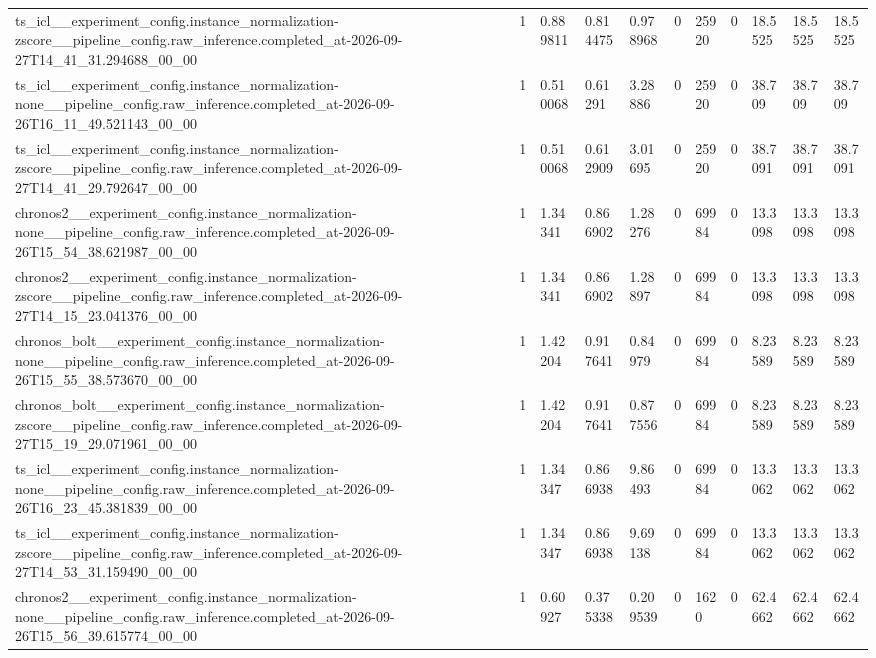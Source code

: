 \begin{tabular}{lllllllllll}
ts\_icl\_\_experiment\_config.instance\_normalization-zscore\_\_pipeline\_config.raw\_inference.completed\_at-2026-09-27T14\_41\_31.294688\_00\_00 & 1 & 0.889811 & 0.814475 & 0.978968 & 0 & 25920 & 0 & 18.5525 & 18.5525 & 18.5525 \\
ts\_icl\_\_experiment\_config.instance\_normalization-none\_\_pipeline\_config.raw\_inference.completed\_at-2026-09-26T16\_11\_49.521143\_00\_00 & 1 & 0.510068 & 0.61291 & 3.28886 & 0 & 25920 & 0 & 38.709 & 38.709 & 38.709 \\
ts\_icl\_\_experiment\_config.instance\_normalization-zscore\_\_pipeline\_config.raw\_inference.completed\_at-2026-09-27T14\_41\_29.792647\_00\_00 & 1 & 0.510068 & 0.612909 & 3.01695 & 0 & 25920 & 0 & 38.7091 & 38.7091 & 38.7091 \\
chronos2\_\_experiment\_config.instance\_normalization-none\_\_pipeline\_config.raw\_inference.completed\_at-2026-09-26T15\_54\_38.621987\_00\_00 & 1 & 1.34341 & 0.866902 & 1.28276 & 0 & 69984 & 0 & 13.3098 & 13.3098 & 13.3098 \\
chronos2\_\_experiment\_config.instance\_normalization-zscore\_\_pipeline\_config.raw\_inference.completed\_at-2026-09-27T14\_15\_23.041376\_00\_00 & 1 & 1.34341 & 0.866902 & 1.28897 & 0 & 69984 & 0 & 13.3098 & 13.3098 & 13.3098 \\
chronos\_bolt\_\_experiment\_config.instance\_normalization-none\_\_pipeline\_config.raw\_inference.completed\_at-2026-09-26T15\_55\_38.573670\_00\_00 & 1 & 1.42204 & 0.917641 & 0.84979 & 0 & 69984 & 0 & 8.23589 & 8.23589 & 8.23589 \\
chronos\_bolt\_\_experiment\_config.instance\_normalization-zscore\_\_pipeline\_config.raw\_inference.completed\_at-2026-09-27T15\_19\_29.071961\_00\_00 & 1 & 1.42204 & 0.917641 & 0.877556 & 0 & 69984 & 0 & 8.23589 & 8.23589 & 8.23589 \\
ts\_icl\_\_experiment\_config.instance\_normalization-none\_\_pipeline\_config.raw\_inference.completed\_at-2026-09-26T16\_23\_45.381839\_00\_00 & 1 & 1.34347 & 0.866938 & 9.86493 & 0 & 69984 & 0 & 13.3062 & 13.3062 & 13.3062 \\
ts\_icl\_\_experiment\_config.instance\_normalization-zscore\_\_pipeline\_config.raw\_inference.completed\_at-2026-09-27T14\_53\_31.159490\_00\_00 & 1 & 1.34347 & 0.866938 & 9.69138 & 0 & 69984 & 0 & 13.3062 & 13.3062 & 13.3062 \\
chronos2\_\_experiment\_config.instance\_normalization-none\_\_pipeline\_config.raw\_inference.completed\_at-2026-09-26T15\_56\_39.615774\_00\_00 & 1 & 0.60927 & 0.375338 & 0.209539 & 0 & 1620 & 0 & 62.4662 & 62.4662 & 62.4662 \\

\end{tabular}
